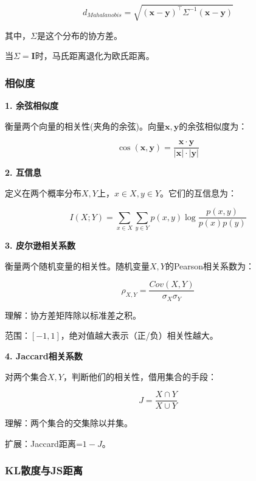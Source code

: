 \begin{equation}
	\label{eq-dist-maha}
	d_{Mahalanobis}=\sqrt{(\mathbf{x}-\mathbf{y})^\top \Sigma^{-1} (\mathbf{x}-\mathbf{y})}
\end{equation}

其中，$\Sigma$是这个分布的协方差。

当$\Sigma=\mathbf{I}$时，马氏距离退化为欧氏距离。

\subsubsection{相似度}

\textbf{1. 余弦相似度}

衡量两个向量的相关性(夹角的余弦)。向量$\mathbf{x},\mathbf{y}$的余弦相似度为：

\begin{equation}
	\label{eq-dist-cosine}
	\cos (\mathbf{x},\mathbf{y}) = \frac{\mathbf{x} \cdot \mathbf{y}}{|\mathbf{x}|\cdot |\mathbf{y}|}
\end{equation}

\textbf{2. 互信息}

定义在两个概率分布$X,Y$上，$x \in X, y \in Y$。它们的互信息为：

\begin{equation}
	\label{eq-dist-info}
	I(X;Y)=\sum_{x \in X} \sum_{y \in Y} p(x,y) \log \frac{p(x,y)}{p(x)p(y)}
\end{equation}

\textbf{3. 皮尔逊相关系数}

衡量两个随机变量的相关性。随机变量$X,Y$的Pearson相关系数为：

\begin{equation}
	\label{eq-dist-pearson}
	\rho_{X,Y}=\frac{Cov(X,Y)}{\sigma_X \sigma_Y}
\end{equation}

理解：协方差矩阵除以标准差之积。

范围：$[-1,1]$，绝对值越大表示（正/负）相关性越大。

\textbf{4. Jaccard相关系数}

对两个集合$X,Y$，判断他们的相关性，借用集合的手段：

\begin{equation}
	\label{eq-dist-jaccard}
	J=\frac{X \cap Y}{X \cup Y}
\end{equation}

理解：两个集合的交集除以并集。

扩展：Jaccard距离=$1-J$。

\subsubsection{KL散度与JS距离}

